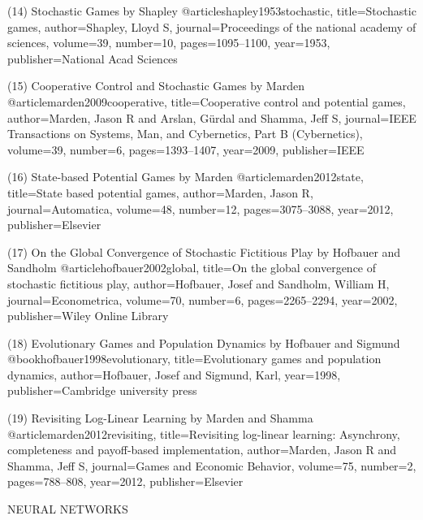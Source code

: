(14) Stochastic Games by Shapley
@article{shapley1953stochastic,
  title={Stochastic games},
  author={Shapley, Lloyd S},
  journal={Proceedings of the national academy of sciences},
  volume={39},
  number={10},
  pages={1095--1100},
  year={1953},
  publisher={National Acad Sciences}
}

(15) Cooperative Control and Stochastic Games by Marden
@article{marden2009cooperative,
  title={Cooperative control and potential games},
  author={Marden, Jason R and Arslan, G{\"u}rdal and Shamma, Jeff S},
  journal={IEEE Transactions on Systems, Man, and Cybernetics, Part B (Cybernetics)},
  volume={39},
  number={6},
  pages={1393--1407},
  year={2009},
  publisher={IEEE}
}

(16) State-based Potential Games by Marden
@article{marden2012state,
  title={State based potential games},
  author={Marden, Jason R},
  journal={Automatica},
  volume={48},
  number={12},
  pages={3075--3088},
  year={2012},
  publisher={Elsevier}
}

(17) On the Global Convergence of Stochastic Fictitious Play by Hofbauer and Sandholm
@article{hofbauer2002global,
  title={On the global convergence of stochastic fictitious play},
  author={Hofbauer, Josef and Sandholm, William H},
  journal={Econometrica},
  volume={70},
  number={6},
  pages={2265--2294},
  year={2002},
  publisher={Wiley Online Library}
}

(18) Evolutionary Games and Population Dynamics by Hofbauer and Sigmund
@book{hofbauer1998evolutionary,
  title={Evolutionary games and population dynamics},
  author={Hofbauer, Josef and Sigmund, Karl},
  year={1998},
  publisher={Cambridge university press}
}

(19) Revisiting Log-Linear Learning by Marden and Shamma
@article{marden2012revisiting,
  title={Revisiting log-linear learning: Asynchrony, completeness and payoff-based implementation},
  author={Marden, Jason R and Shamma, Jeff S},
  journal={Games and Economic Behavior},
  volume={75},
  number={2},
  pages={788--808},
  year={2012},
  publisher={Elsevier}
}



NEURAL NETWORKS

